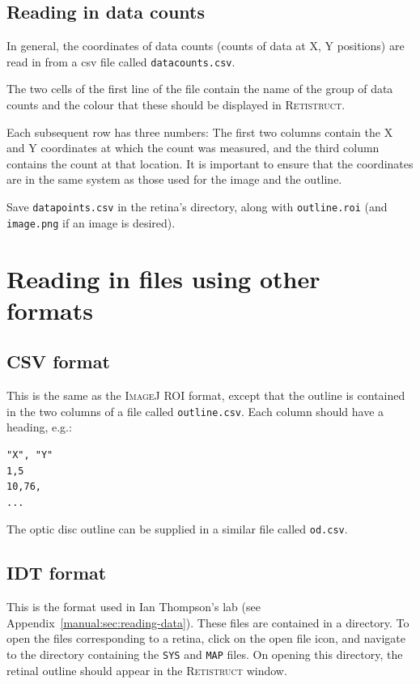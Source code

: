 \documentclass{book}
\begin{document}
\subsection{Reading in data counts}
\label{retistruct-user-guide:sec:read-data-counts}

In general, the coordinates of data counts (counts of data at X, Y
positions) are read in from a csv file called \texttt{datacounts.csv}.

The two cells of the first line of the file contain the name of the
group of data counts and the colour that these should be displayed in
\textsc{Retistruct}. 

Each subsequent row has three numbers: The first two columns contain
the X and Y coordinates at which the count was measured, and the third
column contains the count at that location. It is important to ensure
that the coordinates are in the same system as those used for the
image and the outline.

Save \texttt{datapoints.csv} in the retina's directory, along with
\texttt{outline.roi} (and \texttt{image.png} if an image is desired).

\section{Reading in files using other formats}
\label{retistruct-user-guide:sec:reading-files-using}

\subsection{CSV format}
\label{retistruct-manual:sec:csv-format}

This is the same as the \textsc{ImageJ ROI} format, except that the
outline is contained in the two columns of a file called
\texttt{outline.csv}.  Each column should have a heading, e.g.:
\begin{verbatim}
"X", "Y"
1,5
10,76,
...
\end{verbatim}
The optic disc outline can be supplied in a similar file called
\texttt{od.csv}.

\subsection{IDT format}
\label{retistruct-manual:sec:idt-format}

This is the format used in Ian Thompson's lab (see
Appendix~\ref{manual:sec:reading-data}). These files are contained in
a directory. To open the files corresponding to a retina, click on the
open file icon, and navigate to the directory containing the
\texttt{SYS} and \texttt{MAP} files. On opening this directory, the
retinal outline should appear in the \textsc{Retistruct} window.
\end{document}
